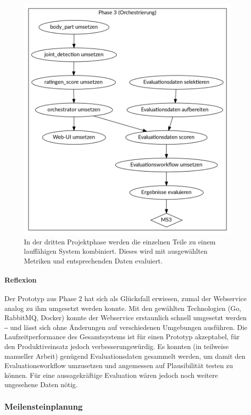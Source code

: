 \begin{figure}[tbh]
    \centering
    \includegraphics[width=0.7\linewidth]{pics/phase3.png}
    \caption{In der dritten Projektphase werden die einzelnen Teile zu einem lauffähigen System kombiniert. Dieses wird mit ausgewählten Metriken und entsprechenden Daten evaluiert.}
    \label{fig:projekt-phase3}
\end{figure}

\paragraph{Reflexion}

Der Prototyp aus Phase 2 hat sich als Glücksfall erwiesen, zumal der Webservice analog zu ihm umgesetzt werden konnte. Mit den gewählten Technologien (Go, RabbitMQ, Docker) konnte der Webservice erstaunlich schnell umgesetzt werden ‒ und lässt sich ohne Änderungen auf verschiedenen Umgebungen ausführen. Die Laufzeitperformance des Gesamtsystems ist für einen Prototyp akzeptabel, für den Produktiveinsatz jedoch verbesserungswürdig. Es konnten (in teilweise manueller Arbeit) genügend Evaluationsdaten gesammelt werden, um damit den Evaluationsworkflow umzusetzen und angemessen auf Plausibilität testen zu können. Für eine aussagekräftige Evaluation wären jedoch noch weitere ungesehene Daten nötig.

\subsubsection{Meilensteinplanung}

